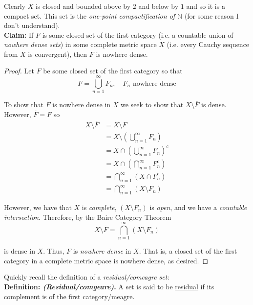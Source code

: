 \documentclass[12pt]{article}
\newlength\tindent
\renewcommand{\indent}{\hspace*{\tindent}}
\newcommand{\N}{\mathbb N}
\begin{document}
\indent Clearly $X$ is closed and bounded above by $2$ and below by $1$ and so it is a compact set. This set is the {\em one-point compactification of $\N$} (for some reason I don't understand). \\

%
%
{\bf Claim:} If $F$ is some closed set of the first category (i.e. a countable union of {\em nowhere dense sets}) in some complete metric space $X$ (i.e. every Cauchy sequence from $X$ is convergent), then $F$ is nowhere dense. \\

\begin{proof} Let $F$ be some closed set of the first category so that
\begin{equation*}
	F = \bigcup^\infty_{n = 1} F_n, \quad F_n \text{ nowhere dense}
\end{equation*}

To show that $F$ is nowhere dense in $X$ we seek to show that $X\setminus\overline{F}$ is dense. However, $\overline{F} = F$ so
\begin{align*}
	X\setminus\overline{F} &= X\setminus F \\
	&= X \setminus \left( \bigcup^\infty_{n = 1} F_n \right) \\
	&= X \cap \left( \bigcup^\infty_{n = 1} F_n \right)^c \\ 
	&= X \cap \left( \bigcap^\infty_{n = 1} F^c_n \right) \\
	&= \bigcap^\infty_{n = 1} \left(X \cap F^c_n \right) \\
	&= \bigcap^\infty_{n = 1} \left(X \setminus F_n \right)
\end{align*}

\indent However, we have that $X$ is {\em complete}, $\left(X \setminus F_n\right)$ is {\em open}, and we have a {\em countable intersection}. Therefore, by the Baire Category Theorem 
\begin{equation*}
	X\setminus\overline{F} = \bigcap^\infty_{n = 1} \left(X \setminus F_n \right)
\end{equation*}

is dense in $X$. Thus, $F$ is {\em nowhere dense} in $X$. That is, a closed set of the first category in a complete metric space is nowhere dense, as desired.
\end{proof}

Quickly recall the definition of a {\em residual/comeagre set}: \\

%
%
{\bf Definition: {\em (Residual/comgeare)}.} A set is said to be \underline{residual} if its complement is of the first category/meagre. \\
\end{document}
